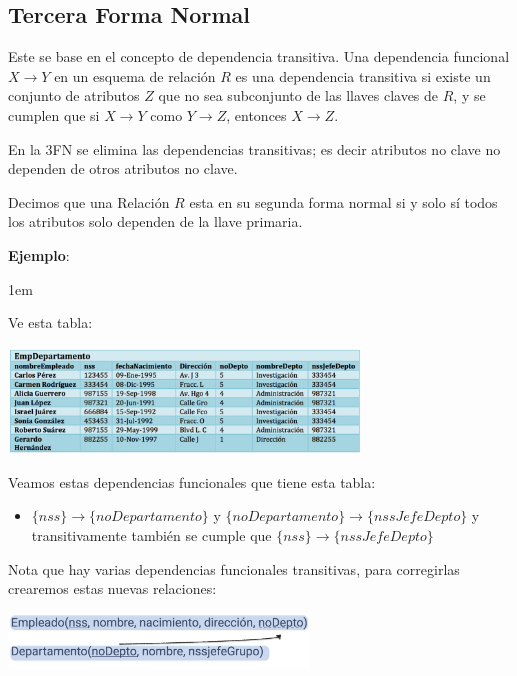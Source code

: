 \documentclass[12pt, fleqn]{report}                             %
\newenvironment{SmallIndentation}[1][0.75em]                    %
    {\begin{adjustwidth}{#1}{}\begin{footnotesize}}                 %
    {\end{footnotesize}\end{adjustwidth}}                           %
\newcommand \longto {\longrightarrow}                           %
\begin{document}
            \clearpage
            \subsection{Tercera Forma Normal}

                Este se base en el concepto de dependencia transitiva.
                Una dependencia funcional $X \longto Y$ en un esquema de relación $R$
                es una dependencia transitiva si existe un conjunto de atributos $Z$
                que no sea subconjunto de las llaves claves de $R$, y se cumplen
                que si $X \longto Y$ como $Y \longto Z$, entonces $X \longto Z$.

                En la 3FN se elimina las dependencias transitivas; es decir atributos no
                clave no dependen de otros atributos no clave.

                Decimos que una Relación $R$ esta en su segunda forma normal
                si y solo sí todos los atributos solo dependen de la llave primaria. 


                \textbf{Ejemplo}:
                \begin{SmallIndentation}[1em]

                    Ve esta tabla:

                    \includegraphics[width=0.70\textwidth]{EjemploParaNormalizarA3FN}
                    
                    Veamos estas dependencias funcionales que tiene esta tabla:
                    \begin{itemize}
                        \item $\{nss\} \to \{noDepartamento\}$ y $\{noDepartamento\} \to \{nssJefeDepto\}$ 
                            y transitivamente también se cumple que $\{nss\} \to \{nssJefeDepto\}$
                    \end{itemize}

                    Nota que hay varias dependencias funcionales transitivas, para corregirlas crearemos
                    estas nuevas relaciones:

                    \includegraphics[width=0.60\textwidth]{EjemploParaNormalizarA3FN2}

                \end{SmallIndentation}
\end{document}
